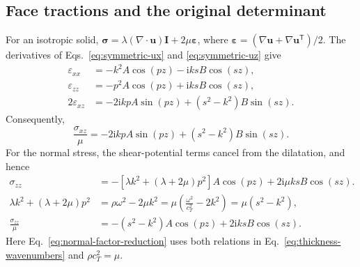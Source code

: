 \subsection{Face tractions and the original determinant}

For an isotropic solid,
\(
  \boldsymbol{\sigma}
  =\lambda(\nabla\mathbin{\cdot}\mathbf{u})\mathbf{I}
   +2\mu\boldsymbol{\varepsilon}
\), where
\(
  \boldsymbol{\varepsilon}
  =(\nabla\mathbf{u}+\nabla\mathbf{u}^{\mathsf T})/2
\).
The derivatives of Eqs.~\eqref{eq:symmetric-ux} and
\eqref{eq:symmetric-uz} give
\begin{align}
  \varepsilon_{xx}
  &=-k^2A\cos(pz)-\mathrm{i}ksB\cos(sz),\\
  \varepsilon_{zz}
  &=-p^2A\cos(pz)+\mathrm{i}ksB\cos(sz),\\
  2\varepsilon_{xz}
  &=-2\mathrm{i}kpA\sin(pz)+(s^2-k^2)B\sin(sz).
  \label{eq:symmetric-strains}
\end{align}
Consequently,
\begin{equation}
  \frac{\sigma_{xz}}{\mu}
  =-2\mathrm{i}kpA\sin(pz)+(s^2-k^2)B\sin(sz).
  \label{eq:shear-traction-through-thickness}
\end{equation}
For the normal stress, the shear-potential terms cancel from the dilatation,
and hence
\begin{align}
  \sigma_{zz}
  &=-\left[\lambda k^2+(\lambda+2\mu)p^2\right]
       A\cos(pz)
    +2\mathrm{i}\mu ksB\cos(sz).                    \label{eq:sigma-zz-first}\\
  \lambda k^2+(\lambda+2\mu)p^2
  &=\rho\omega^2-2\mu k^2
    =\mu\left(\frac{\omega^2}{c_T^2}-2k^2\right)
    =\mu(s^2-k^2),                                    \label{eq:normal-factor-reduction}\\
  \frac{\sigma_{zz}}{\mu}
  &=-(s^2-k^2)A\cos(pz)+2\mathrm{i}ksB\cos(sz).
  \label{eq:normal-traction-through-thickness}
\end{align}
Here Eq.~\eqref{eq:normal-factor-reduction} uses both relations in
Eq.~\eqref{eq:thickness-wavenumbers} and \(\rho c_T^2=\mu\).

